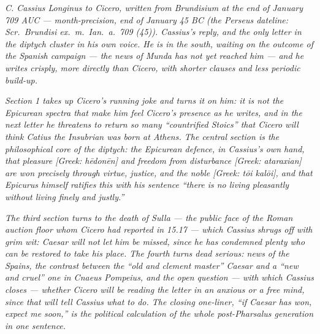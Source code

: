 
\textit{C. Cassius Longinus to Cicero, written from
Brundisium at the end of January 709 AUC ---
month-precision, end of January 45 BC (the Perseus
dateline: \textit{Scr.\ Brundisi ex.\ m.\ Ian.\ a.\ 709
(45)}). Cassius's reply, and the only letter in the
diptych cluster in his own voice. He is in the south,
waiting on the outcome of the Spanish campaign --- the
news of Munda has not yet reached him --- and he writes
crisply, more directly than Cicero, with shorter
clauses and less periodic build-up.}

\textit{Section 1 takes up Cicero's running joke and
turns it on him: it is not the Epicurean
\textit{spectra} that make him feel Cicero's presence
as he writes, and in the next letter he threatens to
return so many ``countrified Stoics'' that Cicero will
think Catius the Insubrian was born at Athens. The
central section is the philosophical core of the
diptych: the Epicurean defence, in Cassius's own hand,
that pleasure \textit{[Greek: hēdonēn]} and freedom
from disturbance \textit{[Greek: ataraxian]} are won
precisely through virtue, justice, and the noble
\textit{[Greek: tōi kalōi]}, and that Epicurus himself
ratifies this with his sentence ``there is no living
pleasantly without living finely and justly.''}

\textit{The third section turns to the death of Sulla
--- the public face of the Roman auction floor whom
Cicero had reported in 15.17 --- which Cassius shrugs
off with grim wit: Caesar will not let him be missed,
since he has condemned plenty who can be restored to
take his place. The fourth turns dead serious: news of
the Spains, the contrast between the ``old and clement
master'' Caesar and a ``new and cruel'' one in Cnaeus
Pompeius, and the open question --- with which
Cassius closes --- whether Cicero will be reading the
letter in an anxious or a free mind, since that will
tell Cassius what to do. The closing one-liner, ``if
Caesar has won, expect me soon,'' is the political
calculation of the whole post-Pharsalus generation in
one sentence.}
